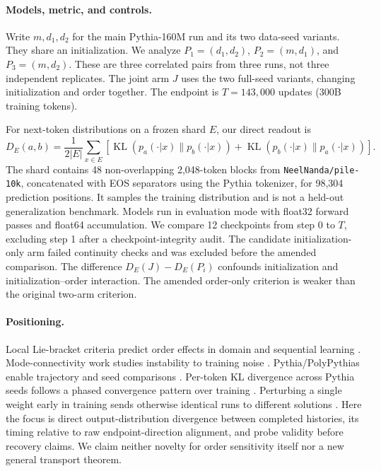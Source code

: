 \documentclass{article}
\newcommand{\KL}{\operatorname{KL}}
\begin{document}
\paragraph{Models, metric, and controls.}
Write $m,d_1,d_2$ for the main Pythia-160M run and its two data-seed variants. They share an initialization. We analyze $P_1=(d_1,d_2)$, $P_2=(m,d_1)$, and $P_3=(m,d_2)$. These are three correlated pairs from three runs, not three independent replicates. The joint arm $J$ uses the two full-seed variants, changing initialization and order together. The endpoint is $T=143{,}000$ updates (300B training tokens).

For next-token distributions on a frozen shard $E$, our direct readout is
\begin{equation}
 D_E(a,b)=\frac{1}{2|E|}\sum_{x\in E}
 [\KL(p_a(\cdot|x)\|p_b(\cdot|x))+\KL(p_b(\cdot|x)\|p_a(\cdot|x))].
\end{equation}
The shard contains 48 non-overlapping 2,048-token blocks from \texttt{NeelNanda/pile-10k}, concatenated with EOS separators using the Pythia tokenizer, for 98,304 prediction positions. It samples the training distribution and is not a held-out generalization benchmark. Models run in evaluation mode with float32 forward passes and float64 accumulation. We compare 12 checkpoints from step 0 to $T$, excluding step 1 after a checkpoint-integrity audit. The candidate initialization-only arm failed continuity checks and was excluded before the amended comparison. The difference $D_E(J)-D_E(P_i)$ confounds initialization and initialization--order interaction. The amended order-only criterion is weaker than the original two-arm criterion.

\paragraph{Positioning.}
Local Lie-bracket criteria predict order effects in domain and sequential learning \citep{rukhovich,sweeney}. Mode-connectivity work studies instability to training noise \citep{frankle}. Pythia/PolyPythias enable trajectory and seed comparisons \citep{pythia,polypythias}. Per-token KL divergence across Pythia seeds follows a phased convergence pattern over training \citep{fehlauer}. Perturbing a single weight early in training sends otherwise identical runs to different solutions \citep{kwok}. Here the focus is direct output-distribution divergence between completed histories, its timing relative to raw endpoint-direction alignment, and probe validity before recovery claims. We claim neither novelty for order sensitivity itself nor a new general transport theorem.
\end{document}
